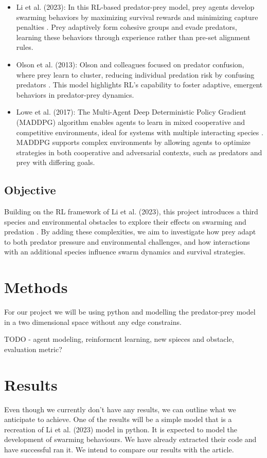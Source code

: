 \documentclass[9pt]{pnas-new}
\begin{document}
\begin{itemize}
    \item Li et al. (2023): In this RL-based predator-prey model, prey agents develop swarming behaviors by maximizing survival rewards and minimizing capture penalties \cite{}. Prey adaptively form cohesive groups and evade predators, learning these behaviors through experience rather than pre-set alignment rules.

    \item Olson et al. (2013): Olson and colleagues focused on predator confusion, where prey learn to cluster, reducing individual predation risk by confusing predators \cite{}. This model highlights RL’s capability to foster adaptive, emergent behaviors in predator-prey dynamics.

    \item Lowe et al. (2017): The Multi-Agent Deep Deterministic Policy Gradient (MADDPG) algorithm enables agents to learn in mixed cooperative and competitive environments, ideal for systems with multiple interacting species \cite{}. MADDPG supports complex environments by allowing agents to optimize strategies in both cooperative and adversarial contexts, such as predators and prey with differing goals.
\end{itemize}

\subsection{Objective}

Building on the RL framework of Li et al. (2023), this project introduces a third species and environmental obstacles to explore their effects on swarming and predation \cite{}. By adding these complexities, we aim to investigate how prey adapt to both predator pressure and environmental challenges, and how interactions with an additional species influence swarm dynamics and survival strategies.


\section*{Methods}

For our project we will be using python and modelling the predator-prey model in a two dimensional space without any edge constrains. 

TODO - 
agent modeling, reinformcnt learning, new spieces and obstacle, evaluation metric?


\section*{Results}
Even though we currently don't have any results, we can outline what we anticipate to achieve. One of the results will be a simple model that is a recreation of Li et al. (2023) model in python. It is expected to model the development of swarming behaviours.  We have already extracted their code and have successful ran it. We intend to compare our results with the article.
\end{document}
